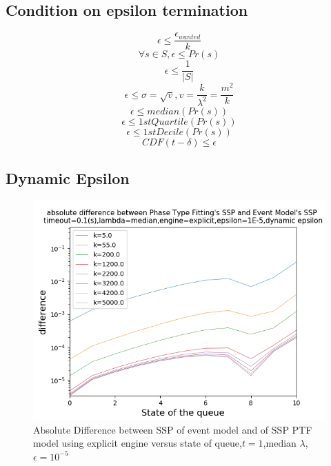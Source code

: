 \documentclass[paper=a4, fontsize=11pt]{scrartcl}
\numberwithin{equation}{section}		%
\numberwithin{figure}{section}			%
\numberwithin{table}{section}				%
\begin{document}
\clearpage
\subsection[epsilon termination]{Condition on epsilon termination}
$$\epsilon \leq \frac{\epsilon_{wanted}}{k}$$
$$\forall s \in S, \epsilon \leq Pr(s)$$
$$\epsilon \leq \frac{1}{|S|}$$
$$\epsilon \leq \sigma = \sqrt{v}, v = \frac{k}{\lambda^2} = \frac{m^2}{k}$$
$$\epsilon \leq median(Pr(s))$$
$$\epsilon \leq 1stQuartile(Pr(s))$$
$$\epsilon \leq 1stDecile(Pr(s))$$
$$CDF(t-\delta) \leq \epsilon$$

\clearpage
\subsection[epsilon termination]{Dynamic Epsilon}


\begin{figure}
	\centering
	\includegraphics[width=17cm]{picture/New_model/1E-5/diff_explicit_dynamic.png}
	\caption{Absolute Difference between SSP of event model and of SSP PTF model using explicit engine versus state of queue,$t=1$,median $\lambda$,$\epsilon=10^{-5}$}
	\label{fig:dist_dynamic_explicit}
\end{figure}	
\end{document}
